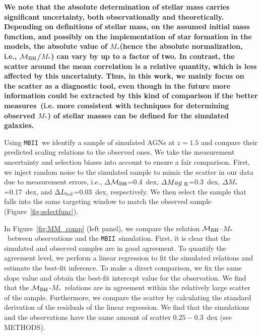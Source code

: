 \documentclass{natureprintstyle}
\newcommand{\mbh}{$\mathcal M_{\rm BH}$}
\newcommand{\mr}{$Mag_{\rm ~R}$}
\newcommand{\mstar}{{$M_*$}}
\newcommand{\mbii}{\texttt{MBII}}
\begin{document}
{\bf We note that the absolute determination of stellar mass carries significant uncertainty, both observationally and theoretically. Depending on definitions of stellar mass, on the assumed initial mass function, and possibly on the implementation of star formation in the models, the absolute value of \mstar (hence the absolute normalization, i.e., \mbh/\mstar) can vary by up to a factor of two. In contrast, the scatter around the mean correlation is a relative quantity, which is less affected by this uncertainty. Thus, in this work, we mainly focus on the scatter as a diagnostic tool, even though in the future more information could be extracted by this kind of comparison if the %
better measures~(i.e. more consistent with techniques for determining observed \mstar) of stellar masses can be defined for the simulated galaxies.}

Using \mbii\, we identify a sample of simulated AGNs at $z=1.5$ and compare their predicted scaling relations to the observed ones. We take the measurement uncertainty and selection biases into account to ensure a fair comparison. First, we inject random noise to the simulated sample to mimic the scatter in our data due to measurement errors, i.e., $\Delta$\mbh =0.4~dex, $\Delta$\mr=0.3~dex, $\Delta$\mstar=0.17~dex, and $\Delta L_{\rm bol}$=0.03~dex, respectively. We then select the sample that falls into the same targeting window to match the observed sample (Figure~\ref{fig:selectfunc}). 

In Figure~\ref{fig:MM_comp} (left panel), we compare the relation \mbh--\mstar~between observations and the \mbii\ simulation. First, it is clear that the simulated and observed samples are in good agreement. To quantify the agreement level, we perform a linear regression to fit the simulated relations and estimate the best-fit inference. To make a direct comparison, we fix the same slope value and obtain the best-fit intercept value for the observation. We find that the \mbh-\mstar\ relations are in agreement within the relatively large scatter of the sample. Furthermore, we compare the scatter by calculating the standard derivation of the residuals of the linear regression. We find that the simulations and the observations have the same amount of scatter $0.25-0.3$~dex (see METHODS).
\end{document}
